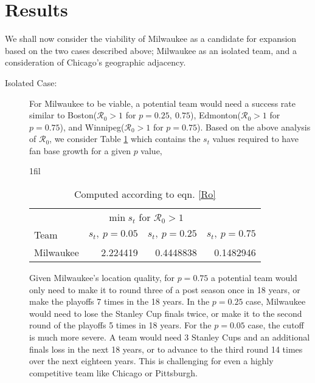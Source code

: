 \documentclass[11pt]{report}            %
\makeatletter
\newcommand{\ro}{\mathcal{R}_0}
\newcommand*{\centerfloat}{%
  \parindent \z@
  \leftskip \z@ \@plus 1fil \@minus \textwidth
  \rightskip\leftskip
  \parfillskip \z@skip}
\makeatother
\begin{document}
\section*{Results}
We shall now consider the viability of Milwaukee as a candidate for expansion based on the two cases described above; Milwaukee as an isolated team, and a consideration of Chicago's geographic adjacency.
\begin{description}
\item[Isolated Case:] For Milwaukee to be viable, a potential team would need a success rate similar to Boston($\ro > 1$ for $p=0.25,\ 0.75$), Edmonton($\ro > 1$ for $p=0.75$), and Winnipeg($\ro > 1$ for $p=0.75$). Based on the above analysis of $\ro$, we consider Table \ref{table:min_st} which contains the $s_t$ values required to have fan base growth for a given $p$ value,
\begin{table}[H]
\centerfloat
\begin{tabular}{lrrr}
\hline
\multicolumn{4}{c}{$\min{s_t}$ for $\ro>1$} \\
Team & $s_t,\ p=0.05$ & $s_t,\ p=0.25$ & $s_t,\ p=0.75$\\
\hline
Milwaukee & 2.224419 & 0.4448838 & 0.1482946\\\hline
\end{tabular}
\caption{Computed according to eqn. \ref{Ro}}
\label{table:min_st}
\end{table}
Given Milwaukee's location quality, for $p=0.75$ a potential team would only need to make it to round three of a post season once in 18 years, or make the playoffs 7 times in the 18 years. In the $p=0.25$ case, Milwaukee would need to lose the Stanley Cup finals twice, or make it to the second round of the playoffs 5 times in 18 years. For the $p=0.05$ case, the cutoff is much more severe. A team would need 3 Stanley Cups and an additional finals loss in the next 18 years, or to advance to the third round 14 times over the next eighteen years. This is challenging for even a highly competitive team like Chicago or Pittsburgh.\\

\end{description}
\end{document}
